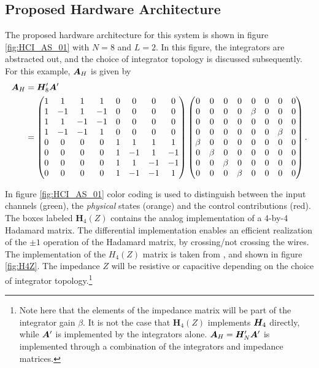 \subsection{Proposed Hardware Architecture}
The proposed hardware architecture for this system is shown in figure \ref{fig:HCI_AS_01} with $N=8$ and $L=2$. In this figure, the integrators are abstracted out, and the choice of integrator topology is discussed subsequently. For this example, $\bm{A}_H$ is given by
\begin{align}
    \bm{A}_H & = \bm{H}'_8 \bm{A}' \\  & =
    \begin{pmatrix}
        1 & 1 & 1 & 1 & 0 & 0 & 0 & 0 \\
        1 & -1 & 1 & -1 & 0 & 0 & 0 & 0 \\
        1 & 1 & -1 & -1 & 0 & 0 & 0 & 0 \\
        1 & -1 & -1 & 1 & 0 & 0 & 0 & 0 \\
        0 & 0 & 0 & 0 & 1 & 1 & 1 & 1 \\
        0 & 0 & 0 & 0 & 1 & -1 & 1 & -1 \\
        0 & 0 & 0 & 0 & 1 & 1 & -1 & -1 \\
        0 & 0 & 0 & 0 & 1 & -1 & -1 & 1
    \end{pmatrix}
    \begin{pmatrix}
        0 & 0 & 0 & 0 & 0 & 0 & 0 & 0 \\
        0 & 0 & 0 & 0 & \beta & 0 & 0 & 0 \\
        0 & 0 & 0 & 0 & 0 & 0 & 0 & 0 \\
        0 & 0 & 0 & 0 & 0 & 0 & \beta & 0 \\
        \beta & 0 & 0 & 0 & 0 & 0 & 0 & 0 \\
        0 & \beta & 0 & 0 & 0 & 0 & 0 & 0 \\
        0 & 0 & \beta & 0 & 0 & 0 & 0 & 0 \\
        0 & 0 & 0 & \beta & 0 & 0 & 0 & 0
    \end{pmatrix}.
\end{align}

In figure \ref{fig:HCI_AS_01} color coding is used to distinguish between the input channels (green), the \textit{physical} states (orange) and the control contributions (red). The boxes labeled $\bm{H}_4(Z)$ contains the analog implementation of a 4-by-4 Hadamard matrix. The differential implementation enables an efficient realization of the $\pm 1$ operation of the Hadamard matrix, by crossing/not crossing the wires. The implementation of the $H_4(Z)$ matrix is taken from \cite{malmberg_thesis}, and shown in figure \ref{fig:H4Z}. The impedance $Z$ will be resistive or capacitive depending on the choice of integrator topology.\footnote{Note here that the elements of the impedance matrix will be part of the integrator gain $\beta$. It is not the case that $\bm{H}_4(Z)$ implements $\bm{H_}{4}$ directly, while $\bm{A}'$ is implemented by the integrators alone. $\bm{A}_H = \bm{H}'_{N}\bm{A}'$ is implemented through a combination of the integrators and impedance matrices.}

